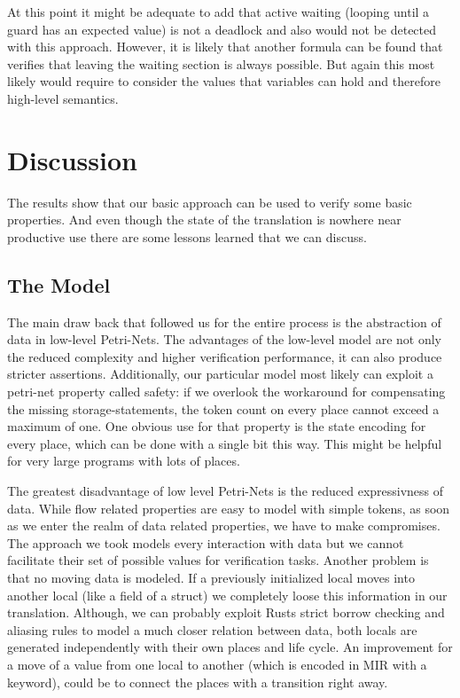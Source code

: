 At this point it might be adequate to add that active waiting (looping until a guard has an expected value) is not a deadlock and also would not be detected with this approach.
However, it is likely that another formula can be found that verifies that leaving the waiting section is always possible.
But again this most likely would require to consider the values that variables can hold and therefore high-level semantics.

\section{Discussion}
The results show that our basic approach can be used to verify some basic properties.
And even though the state of the translation is nowhere near productive use there are some lessons learned that we can discuss.
\subsection{The Model}
The main draw back that followed us for the entire process is the abstraction of data in low-level Petri-Nets.
The advantages of the low-level model are not only the reduced complexity and higher verification performance, it can also produce stricter assertions.
Additionally, our particular model most likely can exploit a petri-net property called safety:
if we overlook the workaround for compensating the missing storage-statements, the token count on every place cannot exceed a maximum of one.
One obvious use for that property is the state encoding for every place, which can be done with a single bit this way.
This might be helpful for very large programs with lots of places.

The greatest disadvantage of low level Petri-Nets is the reduced expressivness of data.
While flow related properties are easy to model with simple tokens, as soon as we enter the realm of data related properties, we have to make compromises.
The approach we took models every interaction with data but we cannot facilitate their set of possible values for verification tasks.
Another problem is that no moving data is modeled.
If a previously initialized local moves into another local (like a field of a struct) we completely loose this information in our translation.
Although, we can probably exploit Rusts strict borrow checking and aliasing rules to model a much closer relation between data,
both locals are generated independently with their own places and life cycle.
An improvement for a move of a value from one local to another (which is encoded in MIR with a keyword), could be to connect the places with a transition right away.

